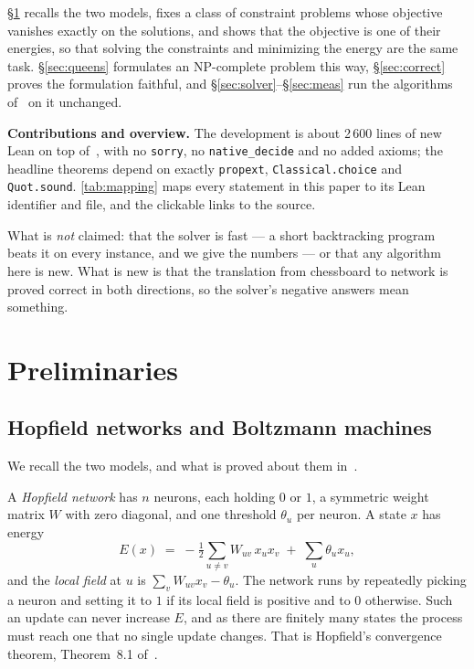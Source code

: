 \documentclass{easychair}
\newcommand{\secref}[1]{\hyperref[#1]{\textcolor{academicpurple}{\S\ref*{#1}}}}
\newcommand{\citeref}[1]{\textcolor{academicpurple}{\cite{#1}}}
\begin{document}
\secref{sec:prelim} recalls the two models, fixes a class of constraint problems whose objective
vanishes exactly on the solutions, and shows that the objective is one of their energies, so that
solving the constraints and minimizing the energy are the same task. \secref{sec:queens} formulates
an \textsf{NP}-complete problem this way, \secref{sec:correct} proves the formulation faithful, and
\secref{sec:solver}--\secref{sec:meas} run the algorithms of~\citeref{liwang2022} on it unchanged.

\medskip\noindent\textbf{Contributions and overview.} The development is about 2\,600 lines of new
Lean on top of~\citeref{hnbm}, with no \lstinline{sorry}, no \lstinline{native_decide} and no added
axioms; the headline theorems depend on exactly \lstinline{propext}, \lstinline{Classical.choice} and
\lstinline{Quot.sound}. \cref{tab:mapping} maps every statement in this paper to its Lean identifier
and file, and the clickable {\faExternalLink} links to the source.

What is \emph{not} claimed: that the solver is fast --- a short backtracking program beats it on every
instance, and we give the numbers --- or that any algorithm here is new. What is new is that the
translation from chessboard to network is proved correct in both directions, so the solver's negative
answers mean something.

\section{Preliminaries}\label{sec:prelim}

\subsection{Hopfield networks and Boltzmann machines}\label{sec:hnbm}

We recall the two models, and what is proved about them in~\citeref{hnbm}.

A \emph{Hopfield network} has $n$ neurons, each holding $0$ or $1$, a symmetric weight matrix $W$ with
zero diagonal, and one threshold $\theta_u$ per neuron. A state $x$ has energy
\begin{equation}\label{eq:E}
  E(x) \;=\; -\tfrac12\sum_{u \neq v} W_{uv}\,x_u x_v \;+\; \sum_u \theta_u x_u ,
\end{equation}
and the \emph{local field} at $u$ is $\sum_{v}W_{uv}x_v - \theta_u$. The network runs by repeatedly
picking a neuron and setting it to $1$ if its local field is positive and to $0$ otherwise. Such an
update can never increase $E$, and as there are finitely many states the process must reach one that
no single update changes. That is Hopfield's convergence theorem, Theorem~8.1 of~\citeref{hnbm}.
\end{document}
